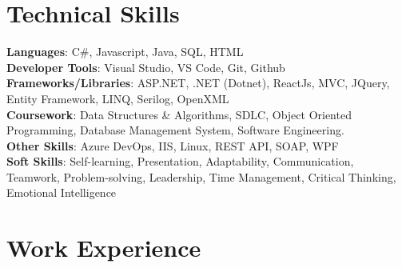 \documentclass[a4paper,12pt]{article}
\begin{document}

\section{\textbf{Technical Skills}}
\begin{itemize}[leftmargin=0.1in, label={}]
    \small{\item{
     \textbf{Languages}: C\#, Javascript, Java, SQL, HTML \\ 
     \textbf{Developer Tools}: Visual Studio, VS Code, Git, Github \\ 
     \textbf{Frameworks/Libraries}: ASP.NET, .NET (Dotnet), ReactJs, MVC, JQuery, Entity Framework, LINQ, Serilog, OpenXML \\ 
     \textbf{Coursework}: Data Structures \& Algorithms, SDLC, Object Oriented Programming, Database Management System, Software Engineering. \\ 
     \textbf{Other Skills}: Azure DevOps, IIS, Linux, REST API, SOAP, WPF \\ 
     \textbf{Soft Skills}: Self-learning, Presentation, Adaptability, Communication, Teamwork, Problem-solving, Leadership, Time Management, Critical Thinking, Emotional Intelligence \\ 
    }}
\end{itemize}


\section{Work Experience}
\end{document}

